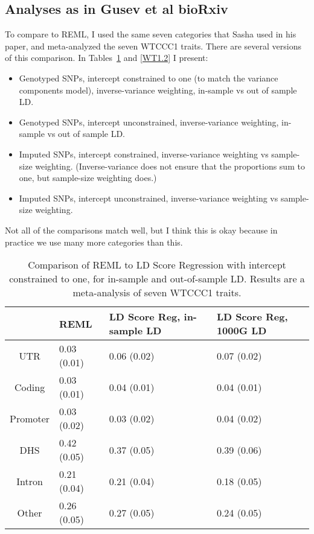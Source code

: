 \documentclass[11pt]{article}
\begin{document}
\subsection{Analyses as in Gusev et al bioRxiv}
\label{GusevComparison}
To compare to REML, I used the same seven categories that Sasha used in his paper, and meta-analyzed the seven WTCCC1 traits. There are several versions of this comparison. In Tables~\ref{WT1.1} and \ref{WT1.2} I present:
\begin{itemize}
\item Genotyped SNPs, intercept constrained to one (to match the variance components model), inverse-variance weighting, in-sample vs out of sample LD.
\item Genotyped SNPs, intercept unconstrained, inverse-variance weighting, in-sample vs out of sample LD.
\item Imputed SNPs, intercept constrained, inverse-variance weighting vs sample-size weighting. (Inverse-variance does not ensure that the proportions sum to one, but sample-size weighting does.)
\item Imputed SNPs, intercept unconstrained, inverse-variance weighting vs sample-size weighting.
\end{itemize}
Not all of the comparisons match well, but I think this is okay because in practice we use many more categories than this.

\begin{table}
\begin{center}
\begin{tabular}[h]{c| l p{2.5cm} p{2.5cm}}
& REML & LD Score Reg, in-sample LD & LD Score Reg, 1000G LD\\
\hline
UTR & 0.03 (0.01) & 0.06 (0.02) & 0.07 (0.02) \\
Coding & 0.03 (0.01) & 0.04 (0.01) & 0.04 (0.01) \\
Promoter & 0.03 (0.02) & 0.03 (0.02) & 0.04 (0.02) \\
DHS & 0.42 (0.05) & 0.37 (0.05) & 0.39 (0.06) \\
Intron & 0.21 (0.04) & 0.21 (0.04) & 0.18 (0.05) \\
Other & 0.26 (0.05) & 0.27 (0.05) & 0.24 (0.05) \\
\end{tabular}
\end{center}
\caption{Comparison of REML to LD Score Regression with intercept constrained to one, for in-sample and out-of-sample LD. Results are a meta-analysis of seven WTCCC1 traits.}
\label{WT1.1}
\end{table}
\end{document}
